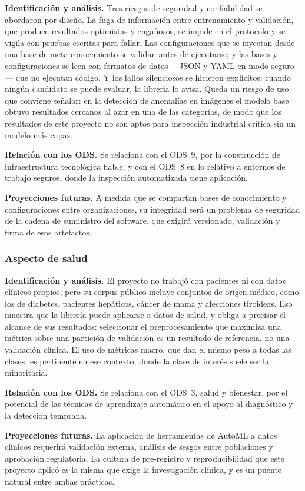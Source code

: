 \textbf{Identificación y análisis.} Tres riesgos de seguridad y confiabilidad se abordaron
por diseño. La fuga de información entre entrenamiento y validación, que produce resultados
optimistas y engañosos, se impide en el protocolo y se vigila con pruebas escritas para
fallar. Las configuraciones que se inyectan desde una base de meta-conocimiento se validan
antes de ejecutarse, y las bases y configuraciones se leen con formatos de datos ---JSON y
YAML en modo seguro--- que no ejecutan código. Y los fallos silenciosos se hicieron
explícitos: cuando ningún candidato se puede evaluar, la librería lo avisa. Queda un riesgo
de uso que conviene señalar: en la detección de anomalías en imágenes el modelo base obtuvo
resultados cercanos al azar en una de las categorías, de modo que los resultados de este
proyecto no son aptos para inspección industrial crítica sin un modelo más capaz.

\textbf{Relación con los ODS.} Se relaciona con el ODS~9, por la construcción de
infraestructura tecnológica fiable, y con el ODS~8 en lo relativo a entornos de trabajo
seguros, donde la inspección automatizada tiene aplicación.

\textbf{Proyecciones futuras.} A medida que se compartan bases de conocimiento y
configuraciones entre organizaciones, su integridad será un problema de seguridad de la
cadena de suministro del software, que exigirá versionado, validación y firma de esos
artefactos.

\subsubsection*{Aspecto de salud}

\textbf{Identificación y análisis.} El proyecto no trabajó con pacientes ni con datos
clínicos propios, pero su corpus público incluye conjuntos de origen médico, como los de
diabetes, pacientes hepáticos, cáncer de mama y afecciones tiroideas. Eso muestra que la
librería puede aplicarse a datos de salud, y obliga a precisar el alcance de sus resultados:
seleccionar el preprocesamiento que maximiza una métrica sobre una partición de validación es
un resultado de referencia, no una validación clínica. El uso de métricas macro, que dan el
mismo peso a todas las clases, es pertinente en ese contexto, donde la clase de interés suele
ser la minoritaria.

\textbf{Relación con los ODS.} Se relaciona con el ODS~3, salud y bienestar, por el potencial
de las técnicas de aprendizaje automático en el apoyo al diagnóstico y la detección temprana.

\textbf{Proyecciones futuras.} La aplicación de herramientas de AutoML a datos clínicos
requerirá validación externa, análisis de sesgos entre poblaciones y aprobación regulatoria.
La cultura de pre-registro y reproducibilidad que este proyecto aplicó es la misma que exige
la investigación clínica, y es un puente natural entre ambas prácticas.

